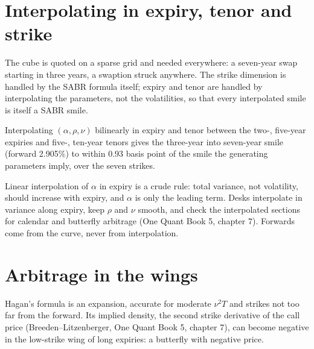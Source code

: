 \section{Interpolating in expiry, tenor and strike}

The cube is quoted on a sparse grid and needed everywhere: a seven-year swap
starting in three years, a swaption struck anywhere. The strike dimension is
handled by the SABR formula itself; expiry and tenor are handled by
interpolating the parameters, not the volatilities, so that every interpolated
smile is itself a SABR smile.

\begin{example}\label{ex:rc:sabr-in-rates-and-the-volatility-cube:missing}
Interpolating $(\alpha,\rho,\nu)$ bilinearly in expiry and tenor between the
two-, five-year expiries and five-, ten-year tenors gives the three-year into
seven-year smile (forward 2.905\%) to within 0.93 basis point of the smile the
generating parameters imply, over the seven strikes.
\end{example}

\begin{remark}\label{rem:rc:sabr-in-rates-and-the-volatility-cube:interp}
Linear interpolation of $\alpha$ in expiry is a crude rule: total variance, not
volatility, should increase with expiry, and $\alpha$ is only the leading term.
Desks interpolate in variance along expiry, keep $\rho$ and $\nu$ smooth, and
check the interpolated sections for calendar and butterfly arbitrage (One Quant
Book 5, chapter 7). Forwards come from the curve, never from interpolation.
\end{remark}

\section{Arbitrage in the wings}

Hagan's formula is an expansion, accurate for moderate $\nu^2T$ and strikes not
too far from the forward. Its implied density, the second strike derivative of
the call price (Breeden--Litzenberger, One Quant Book 5, chapter 7), can become
negative in the low-strike wing of long expiries: a butterfly with negative
price.

\label{lst:rc:sabr-in-rates-and-the-volatility-cube:density}

